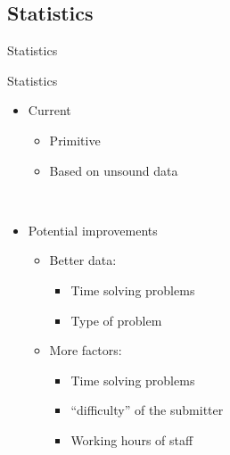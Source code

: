 \subsection{Statistics}
\begin{frame}{Statistics}

\end{frame}

\begin{frame}{Statistics}

\begin{itemize}
\item Current
	\begin{itemize}
	\item Primitive
	\item Based on unsound data
	\end{itemize}
\end{itemize}
\\
\begin{itemize}
\item Potential improvements
	\begin{itemize}
	\item Better data:
		\begin{itemize}
		\item Time solving problems
		\item Type of problem
		\end{itemize}
	\item More factors:
		\begin{itemize}
		\item Time solving problems
		\item ``difficulty'' of the submitter
		\item Working hours of staff
		\end{itemize}
	\end{itemize}
\end{itemize}

\end{frame}